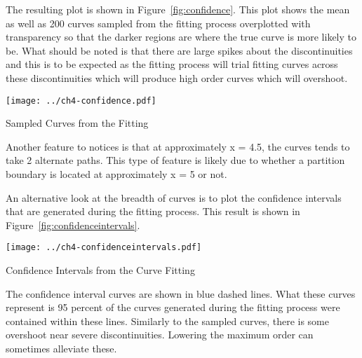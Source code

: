 \documentclass{tufte-handout}
\begin{document}
\lstset{caption=Sampling the Fitting, label=lst:confidence}


The resulting plot is shown in Figure~\ref{fig:confidence}. This plot shows the mean as
well as 200 curves sampled from the fitting process overplotted with transparency so that 
the darker regions are where the true curve is more likely to be. What should be noted
is that there are large spikes about the discontinuities and this is to be expected
as the fitting process will trial fitting curves across these discontinuities which 
will produce high order curves which will overshoot. 

\begin{marginfigure}
\texttt{[image: ../ch4-confidence.pdf]}
\caption{Sampled Curves from the Fitting}
\label{fig:confidence}
\end{marginfigure}

Another feature to notices is that at approximately x = 4.5, the
curves tends to take 2 alternate paths. This type of feature is likely
due to whether a partition boundary is located at approximately x = 5
or not.

An alternative look at the breadth of curves is to plot the confidence
intervals that are generated during the fitting process. This result
is shown in Figure~\ref{fig:confidenceintervals}.

\begin{marginfigure}
\texttt{[image: ../ch4-confidenceintervals.pdf]}
\caption{Confidence Intervals from the Curve Fitting}
\label{fig:confidenceintervals}
\end{marginfigure}

The confidence interval curves are shown in blue dashed lines. What
these curves represent is 95 percent of the curves generated during
the fitting process were contained within these lines. Similarly to
the sampled curves, there is some overshoot near severe
discontinuities.  Lowering the maximum order can sometimes alleviate
these.
\end{document}
